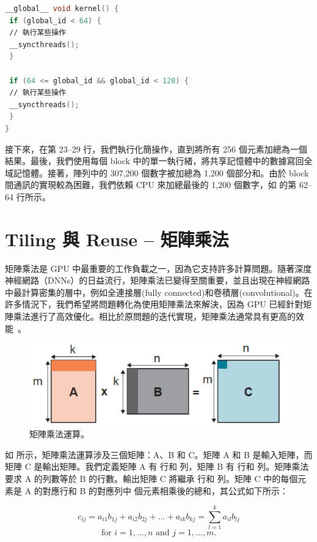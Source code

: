 \begin{lstlisting}[language=C, caption={Barrier 不匹配的範例。}, captionpos=t, label={lst:barrier}]
__global__ void kernel() {
 if (global_id < 64) {
 ∕∕ 執行某些操作
 __syncthreads();
 }

 if (64 <= global_id && global_id < 128) {
 ∕∕ 執行某些操作
 __syncthreads();
 }
}
\end{lstlisting}

接下來，在第 23–29 行，我們執行化簡操作，直到將所有 256 個元素加總為一個結果。最後，我們使用每個 block 中的單一執行緒，將共享記憶體中的數據寫回全域記憶體。接著，陣列中的 307,200 個數字被加總為 1,200 個部分和。由於 block 間通訊的實現較為困難，我們依賴 CPU 來加總最後的 1,200 個數字，如  的第 62–64 行所示。

\section{Tiling 與 Reuse – 矩陣乘法}
矩陣乘法是 GPU 中最重要的工作負載之一，因為它支持許多計算問題。隨著深度神經網路（DNNs）的日益流行，矩陣乘法已變得至關重要，並且出現在神經網路中最計算密集的層中，例如全連接層(fully connected)和卷積層(convolutional)。在許多情況下，我們希望將問題轉化為使用矩陣乘法來解決，因為 GPU 已經針對矩陣乘法進行了高效優化。相比於原問題的迭代實現，矩陣乘法通常具有更高的效能~\cite{Parallel-multi-channel}。

\begin{figure}[h]
    \centering
    \includegraphics[width=0.7\linewidth]{FileAusiliari/Screenshots/Figure8-6.png}
    \caption{矩陣乘法運算。}
    \label{fig:MatrixMultiplication}
\end{figure}

如  所示，矩陣乘法運算涉及三個矩陣：A、B 和 C。矩陣 A 和 B 是輸入矩陣，而矩陣 C 是輸出矩陣。我們定義矩陣 A 有  行和  列，矩陣 B 有  行和  列。矩陣乘法要求 A 的列數等於 B 的行數。輸出矩陣 C 將繼承  行和  列。矩陣 C 中的每個元素是 A 的對應行和 B 的對應列中  個元素相乘後的總和，其公式如下所示：

\[
c_{ij} = a_{i1}b_{1j} + a_{i2}b_{2j} + \dots + a_{ik}b_{kj} = \sum_{l=1}^{k} a_{il}b_{lj}
\]
\[
\text{for } i = 1, \dots, n \text{ and } j = 1, \dots, m.
\]

